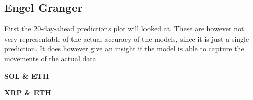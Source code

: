 \subsection{Engel Granger}
First the 20-day-ahead predictions plot will looked at. These are however not very representable of the actual accuracy of the models, since it is just a single prediction. It does however give an insight if the model is able to capture the movements of the actual data.\\
\begin{center}
    \textbf{SOL \& ETH}
\end{center}
\begin{figure}[H]
  \centering
  \quad
  \label{}
\end{figure}
\begin{center}
    \textbf{XRP \& ETH}
\end{center}
